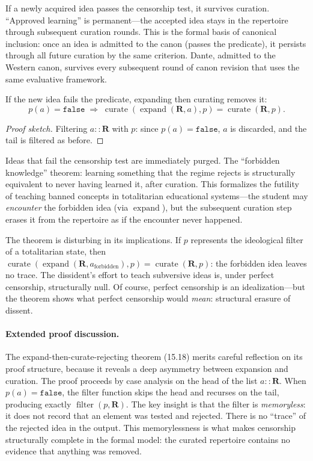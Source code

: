 If a newly acquired idea passes the censorship test, it survives curation.
``Approved learning'' is permanent---the accepted idea stays in the
repertoire through subsequent curation rounds.  This is the formal basis
of canonical inclusion: once an idea is admitted to the canon (passes the
predicate), it persists through all future curation by the same criterion.
Dante, admitted to the Western canon, survives every subsequent round of
canon revision that uses the same evaluative framework.

\begin{theorem}
\label{thm:expand-curate-reject}
If the new idea fails the predicate, expanding then curating removes it:
\[
  p(a) = \texttt{false}
  \;\Longrightarrow\;
  \operatorname{curate}(\operatorname{expand}(\mathbf{R}, a), p)
  = \operatorname{curate}(\mathbf{R}, p).
\]
\end{theorem}

\begin{proof}[Proof sketch]
Filtering $a :: \mathbf{R}$ with $p$: since $p(a) = \texttt{false}$,
$a$ is discarded, and the tail is filtered as before.
\end{proof}

Ideas that fail the censorship test are immediately purged.  The
``forbidden knowledge'' theorem: learning something that the regime rejects
is structurally equivalent to never having learned it, after curation.  This
formalizes the futility of teaching banned concepts in totalitarian
educational systems---the student may \emph{encounter} the forbidden idea
(via $\operatorname{expand}$), but the subsequent curation step erases it
from the repertoire as if the encounter never happened.

The theorem is disturbing in its implications.  If $p$ represents the
ideological filter of a totalitarian state, then
$\operatorname{curate}(\operatorname{expand}(\mathbf{R}, a_{\text{forbidden}}), p)
= \operatorname{curate}(\mathbf{R}, p)$: the forbidden idea leaves no trace.
The dissident's effort to teach subversive ideas is, under perfect
censorship, structurally null.  Of course, perfect censorship is an
idealization---but the theorem shows what perfect censorship would
\emph{mean}: structural erasure of dissent.

\paragraph{Extended proof discussion.}
The expand-then-curate-rejecting theorem (15.18) merits careful
reflection on its proof structure, because it reveals a deep asymmetry
between expansion and curation.  The proof proceeds by case analysis on
the head of the list $a :: \mathbf{R}$.  When $p(a) = \texttt{false}$,
the filter function skips the head and recurses on the tail, producing
exactly $\operatorname{filter}(p, \mathbf{R})$.  The key insight is that
the filter is \emph{memoryless}: it does not record that an element was
tested and rejected.  There is no ``trace'' of the rejected idea in the
output.  This memorylessness is what makes censorship structurally
complete in the formal model: the curated repertoire contains no evidence
that anything was removed.

